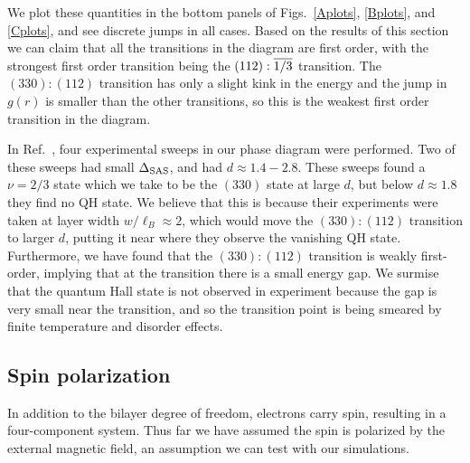 We plot these quantities in the bottom panels of Figs.~\ref{Aplots}, \ref{Bplots}, and \ref{Cplots}, and see discrete jumps in all cases.
Based on the results of this section we can claim that all the transitions in the diagram are first order, with the strongest first order transition being the $(112):\overline{1/3}$ transition. The $(330):(112)$ transition has only a slight kink in the energy and the jump in $g(r)$ is smaller than the other transitions, so this is the weakest first order transition in the diagram.

In Ref.~\cite{Hirayama2004}, four experimental sweeps in our phase diagram were performed. Two of these sweeps had small $\Delta_\textrm{SAS}$, and had $d\approx1.4-2.8$. These sweeps found a $\nu=2/3$ state which we take to be the $(330)$ state at large $d$, but below $d\approx1.8$ they find no QH state. 
We believe that this is because their experiments were taken at layer width $w/\ell_B\approx2$, which would move the $(330):(112)$ transition to larger $d$, putting it near where they observe the vanishing QH state. 
Furthermore, we have found that the $(330):(112)$ transition is weakly first-order, implying that at the transition there is a small energy gap. 
We surmise that the quantum Hall state is not observed in experiment because the gap is very small near the transition, and so the transition point is being smeared by finite temperature and disorder effects.

\subsection{Spin polarization}\label{sec:polarization}

In addition to the bilayer degree of freedom, electrons carry spin, resulting in a four-component system.
Thus far we have assumed the spin is polarized by the external magnetic field, an assumption we can test with our simulations. 

